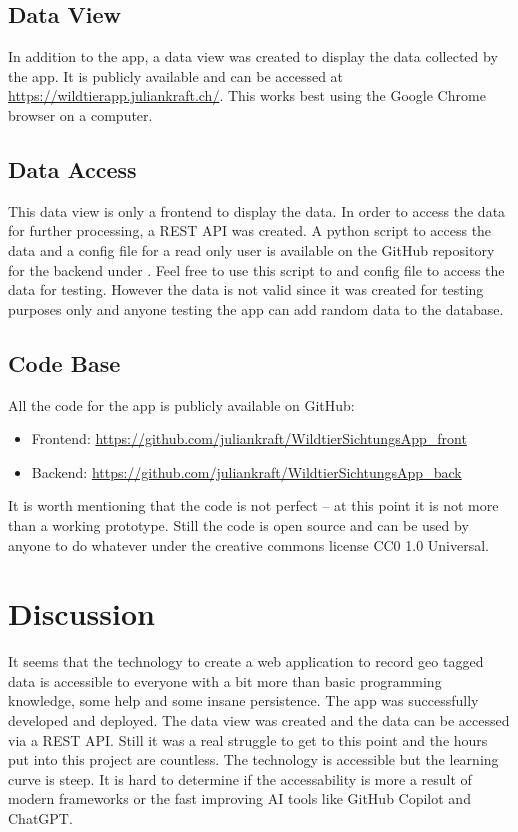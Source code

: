 \documentclass{josis}
\begin{document}
\subsection{Data View}

In addition to the app, a data view was created to display the data collected by the app. It is publicly available and can be 
accessed at \url{https://wildtierapp.juliankraft.ch/}. This works best using the Google Chrome browser on a computer.

\subsection{Data Access}

This data view is only a frontend to display the data. In order to access the data for further processing, a REST API was created.
A python script to access the data and a config file for a read only user is available on the GitHub repository 
for the backend under .
Feel free to use this script to and config file to access the data for testing. However the data is not valid since it was created for testing purposes only
and anyone testing the app can add random data to the database.

\subsection{Code Base}
All the code for the app is publicly available on GitHub:
\begin{itemize}
    \item Frontend: \url{https://github.com/juliankraft/WildtierSichtungsApp_front}
    \item Backend: \url{https://github.com/juliankraft/WildtierSichtungsApp_back}
\end{itemize}

It is worth mentioning that the code is not perfect -- at this point it is not more than a working prototype. Still the code is open source and can
be used by anyone to do whatever under the creative commons license CC0 1.0 Universal.

\section{Discussion}

It seems that the technology to create a web application to record geo tagged data is accessible to everyone with a bit more than basic programming knowledge,
some help and some insane persistence. The app was successfully developed and deployed. The data view was created and the data can be accessed via a REST API.
Still it was a real struggle to get to this point and the hours put into this project are countless. The technology is accessible but the learning curve is steep.
It is hard to determine if the accessability is more a result of modern frameworks or the fast improving AI tools like GitHub Copilot and ChatGPT.
\end{document}
